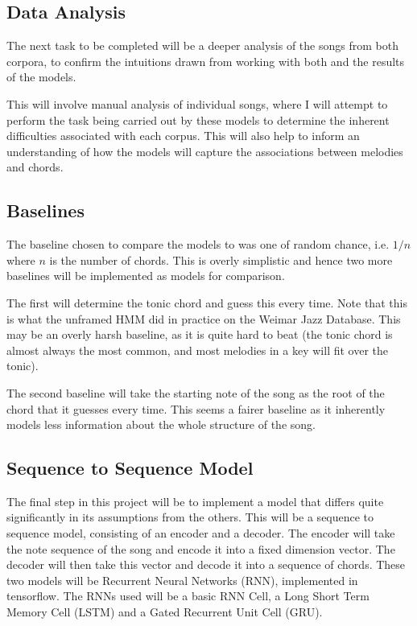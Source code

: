 \documentclass[bsc,singlespacing,parskip, deptreport]{infthesis}
\begin{document}
\subsection{Data Analysis}

The next task to be completed will be a deeper analysis of the songs from both corpora, to confirm the intuitions drawn from working with both and the results of the models.

This will involve manual analysis of individual songs, where I will attempt to perform the task being carried out by these models to determine the inherent difficulties associated with each corpus. This will also help to inform an understanding of how the models will capture the associations between melodies and chords. 

\subsection{Baselines}

The baseline chosen to compare the models to was one of random chance, i.e. $1/n$ where $n$ is the number of chords. This is overly simplistic and hence two more baselines will be implemented as models for comparison.

The first will determine the tonic chord and guess this every time. Note that this is what the unframed HMM did in practice on the Weimar Jazz Database. This may be an overly harsh baseline, as it is quite hard to beat (the tonic chord is almost always the most common, and most melodies in a key will fit over the tonic).

The second baseline will take the starting note of the song as the root of the chord that it guesses every time. This seems a fairer baseline as it inherently models less information about the whole structure of the song.

\subsection{Sequence to Sequence Model}

The final step in this project will be to implement a model that differs quite significantly in its assumptions from the others. This will be a sequence to sequence model, consisting of an encoder and a decoder. The encoder will take the note sequence of the song and encode it into a fixed dimension vector. The decoder will then take this vector and decode it into a sequence of chords. These two models will be Recurrent Neural Networks (RNN), implemented in tensorflow. The RNNs used will be a basic RNN Cell, a Long Short Term Memory Cell (LSTM) and a Gated Recurrent Unit Cell (GRU).



\end{document}
